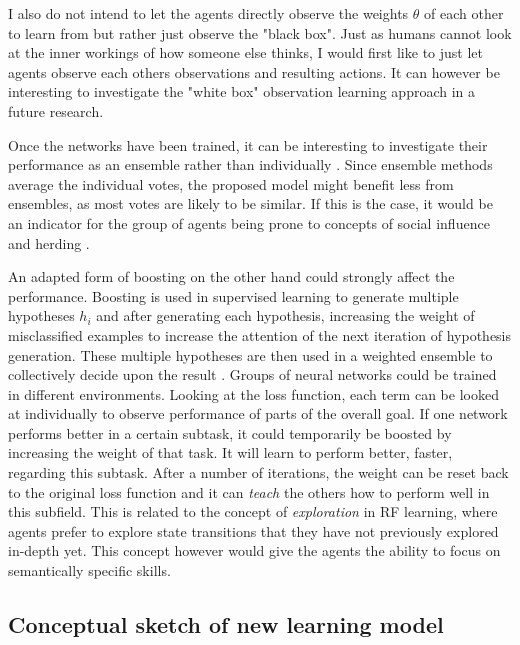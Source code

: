 \documentclass[12pt,a4paper]{article}
\begin{document}
I also do not intend to let the agents directly observe the weights $\theta$ of each other to learn from but rather just observe the "black box". Just as humans cannot look at the inner workings of how someone else thinks, I would first like to just let agents observe each others observations and resulting actions. It can however be interesting to investigate the "white box" observation learning approach in a future research.


Once the networks have been trained, it can be interesting to investigate their performance as an ensemble rather than individually \cite{opitz1999popular}. Since ensemble methods average the individual votes, the proposed model might benefit less from ensembles, as most votes are likely to be similar. If this is the case, it would be an indicator for the group of agents being prone to concepts of social influence and herding \cite{2015-45614-00120160201, hirshleifer1994blind}.

An adapted form of boosting on the other hand could strongly affect the performance. Boosting is used in supervised learning to generate multiple hypotheses $h_i$ and after generating each hypothesis, increasing the weight of misclassified examples to increase the attention of the next iteration of hypothesis generation. These multiple hypotheses are then used in a weighted ensemble to collectively decide upon the result \cite[p.749 ff.]{russell2016artificial}. Groups of neural networks could be trained in different environments. Looking at the loss function, each term can be looked at individually to observe performance of parts of the overall goal. If one network performs better in a certain subtask, it could temporarily be boosted by increasing the weight of that task. It will learn to perform better, faster, regarding this subtask. After a number of iterations, the weight can be reset back to the original loss function and it can \emph{teach} the others how to perform well in this subfield. This is related to the concept of \emph{exploration} in RF learning, where agents prefer to explore state transitions that they have not previously explored in-depth yet. This concept however would give the agents the ability to focus on semantically specific skills.

\subsection{Conceptual sketch of new learning model}
\end{document}
